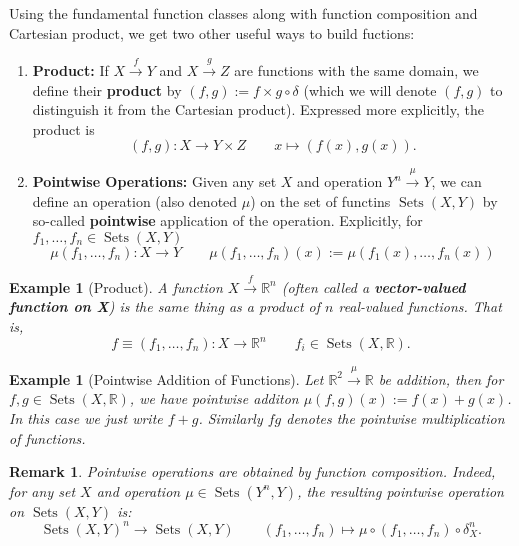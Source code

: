 \documentclass[12pt]{amsart}
\newtheorem{example}[theorem]{Example}
\newtheorem{remark}[theorem]{Remark}
\numberwithin{equation}{section}
\newcommand\Rb{{\mathbb R}} %
\newcommand{\diag}{\delta}
\newcommand{\op}{\mu}
\newcommand{\To}{\longrightarrow}
\newcommand{\mTo}{\longmapsto}
\newcommand{\Tof}[1]{\stackrel{#1}{\!\longrightarrow\!}}
\DeclareMathOperator{\Sets}{Sets}
\begin{document}
Using the fundamental function classes along with function composition and Cartesian product, we get two other useful ways to build fuctions:
\begin{enumerate}
  \item \textbf{Product:} If $X\Tof{f} Y$ and $X\Tof{g} Z$ are functions with the same domain, we define their \textbf{product} by $(f,g):=f\times g \circ \delta$  (which we will denote $(f,g)$ to distinguish it from the Cartesian product).  Expressed more explicitly, the product is
 \[    (f,g):X\To Y\times Z \qquad x\mTo (f(x),g(x)). \]  
\item \textbf{Pointwise Operations:} Given any set $X$ and operation $Y^n\Tof{\mu} Y$, we can define an operation (also denoted $\mu$) on the set of functins $\Sets(X,Y)$ by so-called \textbf{pointwise} application of the operation.  Explicitly, for $f_1,\dots,f_n\in \Sets(X,Y)$ 
\[\mu(f_1,\dots,f_n):X\To Y\qquad \mu(f_1,\dots,f_n)(x):=\mu(f_1(x),\dots,f_n(x))\]
\end{enumerate}
\begin{example}[Product] A function $X\Tof{f} \Rb^n$ (often called a \textbf{vector-valued function on X}) is the same thing as a product of $n$ real-valued functions.  That is, 
\[ f\equiv (f_1,\dots,f_n):X\To \Rb^n \qquad f_i\in \Sets(X,\Rb). \]
\end{example}
\begin{example}[Pointwise Addition of Functions]
Let $\Rb^2\Tof{\mu}\Rb$ be addition, then for $f,g\in\Sets(X,\Rb)$, we have pointwise additon $\op(f,g)(x):= f(x)+g(x)$.  In this case we just write $f+g$.  Similarly $fg$ denotes the pointwise multiplication of functions. 
\end{example}


\begin{remark}Pointwise operations are obtained by function composition.  Indeed, for any set $X$ and operation $\op\in\Sets(Y^n,Y)$, the resulting pointwise operation on $\Sets(X,Y)$ is:
\[ \Sets(X,Y)^n\To\Sets(X,Y)\qquad (f_1,\dots,f_n)\mTo \op\circ(f_1,\dots,f_n)\circ\diag_X^n.\] 
\end{remark}
\end{document}
